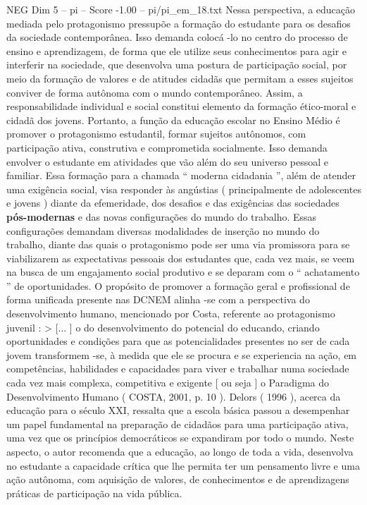 \begin{textsample}{NEG Dim 5 – pi – Score -1.00 – pi/pi\_em\_18.txt}
Nessa perspectiva, a educação mediada pelo protagonismo pressupõe a formação do estudante para os desafios da sociedade contemporânea.
Isso demanda colocá -lo no centro do processo de ensino e aprendizagem, de forma que ele utilize seus conhecimentos para agir e interferir na sociedade, que desenvolva uma postura de participação social, por meio da formação de valores e de atitudes cidadãs que permitam a esses sujeitos conviver de forma autônoma com o mundo contemporâneo.
Assim, a responsabilidade individual e social constitui elemento da formação ético-moral e cidadã dos jovens.
Portanto, a função da educação escolar no Ensino Médio é promover o protagonismo estudantil, formar sujeitos autônomos, com participação ativa, construtiva e comprometida socialmente.
Isso demanda envolver o estudante em atividades que vão além do seu universo pessoal e familiar.
Essa formação para a chamada “ moderna cidadania ”, além de atender uma exigência social, visa responder às angústias ( principalmente de adolescentes e jovens ) diante da efemeridade, dos desafios e das exigências das sociedades \textbf{pós-modernas} e das novas configurações do mundo do trabalho.
Essas configurações demandam diversas modalidades de inserção no mundo do trabalho, diante das quais o protagonismo pode ser uma via promissora para se viabilizarem as expectativas pessoais dos estudantes que, cada vez mais, se veem na busca de um engajamento social produtivo e se deparam com o “ achatamento ” de oportunidades.
O propósito de promover a formação geral e profissional de forma unificada presente nas DCNEM alinha -se com a perspectiva do desenvolvimento humano, mencionado por Costa, referente ao protagonismo juvenil : > [... ] o do desenvolvimento do potencial do educando, criando oportunidades e condições para que as potencialidades presentes no ser de cada jovem transformem -se, à medida que ele se procura e se experiencia na ação, em competências, habilidades e capacidades para viver e trabalhar numa sociedade cada vez mais complexa, competitiva e exigente [ ou seja ] o Paradigma do Desenvolvimento Humano ( COSTA, 2001, p. 10 ).
Delors ( 1996 ), acerca da educação para o século XXI, ressalta que a escola básica passou a desempenhar um papel fundamental na preparação de cidadãos para uma participação ativa, uma vez que os princípios democráticos se expandiram por todo o mundo.
Neste aspecto, o autor recomenda que a educação, ao longo de toda a vida, desenvolva no estudante a capacidade crítica que lhe permita ter um pensamento livre e uma ação autônoma, com aquisição de valores, de conhecimentos e de aprendizagens práticas de participação na vida pública.

\end{textsample}
